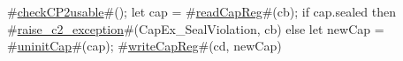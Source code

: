 #\hyperref[zcheckCP2usable]{checkCP2usable}#();
let cap  = #\hyperref[zreadCapReg]{readCapReg}#(cb);
if cap.sealed then
  #\hyperref[zraisezyc2zyexception]{raise\_c2\_exception}#(CapEx_SealViolation, cb)
else
{
  let newCap = #\hyperref[zuninitCap]{uninitCap}#(cap);
  #\hyperref[zwriteCapReg]{writeCapReg}#(cd, newCap)
}
